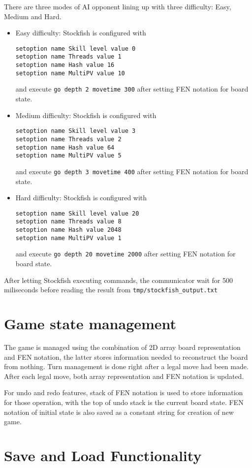 \documentclass[a4paper, 10pt, titlepage]{report}
\begin{document}
There are three modes of AI opponent lining up with three difficulty: Easy, Medium and Hard.
\begin{itemize}
  \item Easy difficulty: Stockfish is configured with \begin{verbatim}
setoption name Skill level value 0
setoption name Threads value 1     
setoption name Hash value 16      
setoption name MultiPV value 10    
\end{verbatim} and execute \texttt{go depth 2 movetime 300} after setting FEN notation for board state.
  \item Medium difficulty: Stockfish is configured with \begin{verbatim}
setoption name Skill level value 3
setoption name Threads value 2     
setoption name Hash value 64      
setoption name MultiPV value 5    
\end{verbatim} and execute \texttt{go depth 3 movetime 400} after setting FEN notation for board state.
  \item Hard difficulty: Stockfish is configured with \begin{verbatim}
setoption name Skill level value 20
setoption name Threads value 8     
setoption name Hash value 2048      
setoption name MultiPV value 1    
\end{verbatim} and execute \texttt{go depth 20 movetime 2000} after setting FEN notation for board state.
\end{itemize}
After letting Stockfish executing commands, the communicator wait for 500 miliseconds before reading the result from \texttt{tmp/stockfish\_output.txt}
\section{Game state management}
The game is managed using the combination of 2D array board representation and FEN notation, the latter stores information needed to reconstruct the board from nothing. Turn management is done right after a legal move had been made. After each legal move, both array representation and FEN notation is updated. 

For undo and redo features, stack of FEN notation is used to store information for those operation, with the top of undo stack is the current board state. FEN notation of initial state is also saved as a constant string for creation of new game.

\section{Save and Load Functionality}
\end{document}
